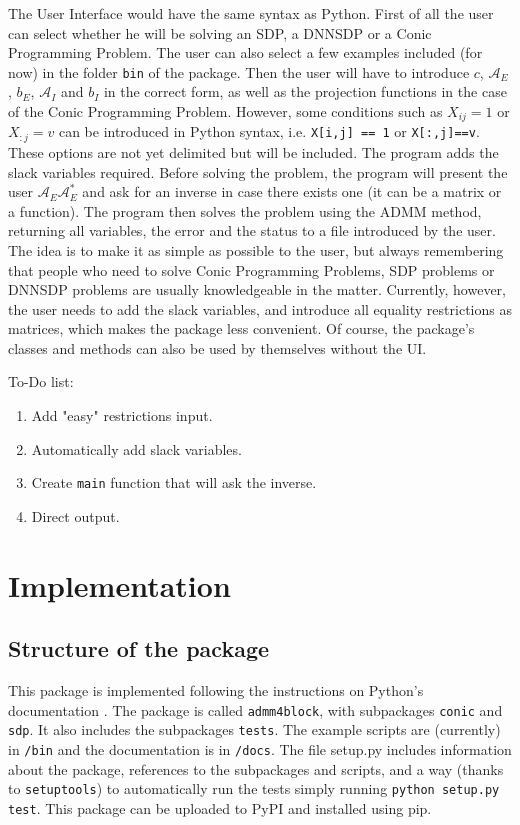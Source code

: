 \documentclass[paper=a4, fontsize=11pt]{scrartcl}
\numberwithin{equation}{section}		%
\numberwithin{figure}{section}			%
\numberwithin{table}{section}				%
\begin{document}
The User Interface would have the same syntax as Python. First of all the user can select whether he will be solving an SDP, a DNNSDP or a Conic Programming Problem. The user can also select a few examples included (for now) in the folder \texttt{bin} of the package. Then the user will have to introduce $c$, $\mathcal{A}_E$, $b_E$, $\mathcal{A}_I$ and $b_I$ in the correct form, as well as the projection functions in the case of the Conic Programming Problem. However, some conditions such as $X_{ij} = 1$ or $X_{:j} = v$ can be introduced in Python syntax, i.e. \texttt{X[i,j] == 1} or \texttt{X[:,j]==v}. These options are not yet delimited but will be included. The program adds the slack variables required. Before solving the problem, the program will present the user $\mathcal{A}_E\mathcal{A}_E^*$ and ask for an inverse in case there exists one (it can be a matrix or a function). The program then solves the problem using the ADMM method, returning all variables, the error and the status to a file introduced by the user. The idea is to make it as simple as possible to the user, but always remembering that people who need to solve Conic Programming Problems, SDP problems or DNNSDP problems are usually knowledgeable in the matter. Currently, however, the user needs to add the slack variables, and introduce all equality restrictions as matrices, which makes the package less convenient. Of course, the package's classes and methods can also be used by themselves without the UI.

To-Do list:
\begin{enumerate}
\item Add "easy" restrictions input.
\item Automatically add slack variables.
\item Create \texttt{main} function that will ask the inverse.
\item Direct output.
\end{enumerate}

\section{Implementation}
\subsection{Structure of the package}
This package is implemented following the instructions on Python's documentation \cite{pythondocs}. The package is called \texttt{admm4block}, with subpackages \texttt{conic} and \texttt{sdp}. It also includes the subpackages \texttt{tests}. The example scripts are (currently) in \texttt{/bin} and the documentation is in \texttt{/docs}. The file setup.py includes information about the package, references to the subpackages and scripts, and a way (thanks to \texttt{setuptools}) to automatically run the tests simply running \texttt{python setup.py test}. This package can be uploaded to PyPI and installed using pip.
\end{document}
